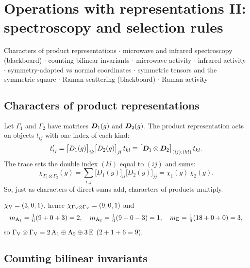 \chapter{Operations with representations II: spectroscopy and selection rules}\label{ch:ops2}

\begin{watch}{}
Characters of product representations  $\cdot$
microwave and infrared spectroscopy (blackboard)  $\cdot$
counting bilinear invariants  $\cdot$
microwave activity  $\cdot$
infrared activity  $\cdot$
symmetry-adapted vs normal coordinates  $\cdot$
symmetric tensors and the symmetric square  $\cdot$
Raman scattering (blackboard)  $\cdot$
Raman activity 
\end{watch}

\section{Characters of product representations}

Let $\Gamma_1$ and $\Gamma_2$ have matrices $\bm{D}_1(g)$ and $\bm{D}_2(g)$. The
product representation acts on objects $t_{ij}$ with one index of each kind:
\[
t'_{ij}=\bigl[D_1(g)\bigr]_{ik}\bigl[D_2(g)\bigr]_{jl}\,t_{kl}
\equiv\bigl[\bm{D}_1\otimes\bm{D}_2\bigr]_{(ij),(kl)}\,t_{kl}.
\]
The trace sets the double index $(kl)$ equal to $(ij)$ and sums:
\[
\chi_{\Gamma_1\otimes\Gamma_2}(g)=\sum_{i,j}\bigl[D_1(g)\bigr]_{ii}\bigl[D_2(g)\bigr]_{jj}
=\chi_1(g)\,\chi_2(g).
\]
So, just as characters of direct sums add, characters of products multiply.

\begin{example}
$\chi_{\mathrm{V}}=(3,0,1)$, hence $\chi_{\Gamma_{\mathrm{V}}\otimes\Gamma_{\mathrm{V}}}=(9,0,1)$ and
\[
m_{\mathrm{A}_1}=\tfrac16(9+0+3)=2,\quad m_{\mathrm{A}_2}=\tfrac16(9+0-3)=1,\quad
m_{\mathrm{E}}=\tfrac16(18+0+0)=3,
\]
so $\Gamma_{\mathrm{V}}\otimes\Gamma_{\mathrm{V}}=2\,\mathrm{A}_1\oplus\mathrm{A}_2\oplus3\,\mathrm{E}$ ($2+1+6=9$).
\end{example}

\section{Counting bilinear invariants}\label{sec:countinv}

